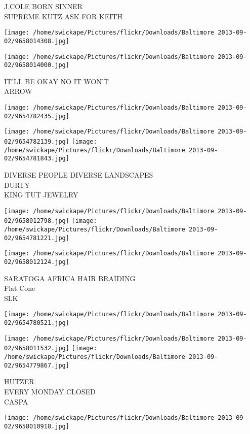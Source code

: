 \documentclass[10pt,letterpaper]{article}
\begin{document}
J.COLE BORN SINNER\\
SUPREME KUTZ ASK FOR KEITH
\pagebreak

\texttt{[image: /home/swickape/Pictures/flickr/Downloads/Baltimore 2013-09-02/9658014308.jpg]}

\vspace{0.25in}
\texttt{[image: /home/swickape/Pictures/flickr/Downloads/Baltimore 2013-09-02/9658014000.jpg]}

IT'LL BE OKAY NO IT WON'T\\
ARROW
\pagebreak

\texttt{[image: /home/swickape/Pictures/flickr/Downloads/Baltimore 2013-09-02/9654782435.jpg]}

\vspace{0.25in}
\texttt{[image: /home/swickape/Pictures/flickr/Downloads/Baltimore 2013-09-02/9654782139.jpg]}
\texttt{[image: /home/swickape/Pictures/flickr/Downloads/Baltimore 2013-09-02/9654781843.jpg]}

DIVERSE PEOPLE DIVERSE LANDSCAPES\\
DURTY\\
KING TUT JEWELRY
\pagebreak

\texttt{[image: /home/swickape/Pictures/flickr/Downloads/Baltimore 2013-09-02/9658012798.jpg]}
\texttt{[image: /home/swickape/Pictures/flickr/Downloads/Baltimore 2013-09-02/9654781221.jpg]}

\vspace{0.25in}
\texttt{[image: /home/swickape/Pictures/flickr/Downloads/Baltimore 2013-09-02/9658012124.jpg]}

SARATOGA AFRICA HAIR BRAIDING\\
Flat Cone\\
SLK
\pagebreak

\texttt{[image: /home/swickape/Pictures/flickr/Downloads/Baltimore 2013-09-02/9654780521.jpg]}

\vspace{0.25in}
\texttt{[image: /home/swickape/Pictures/flickr/Downloads/Baltimore 2013-09-02/9658011532.jpg]}
\texttt{[image: /home/swickape/Pictures/flickr/Downloads/Baltimore 2013-09-02/9654779867.jpg]}

HUTZER\\
EVERY MONDAY CLOSED\\
CASPA
\pagebreak

\texttt{[image: /home/swickape/Pictures/flickr/Downloads/Baltimore 2013-09-02/9658010918.jpg]}
\end{document}
